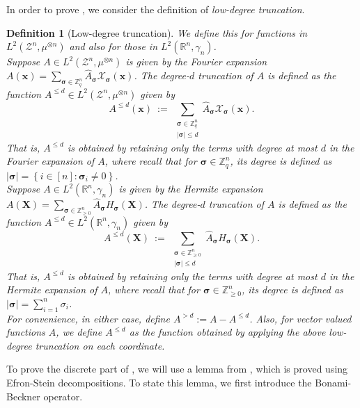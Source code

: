 \documentclass[11pt]{article}
\newcommand{\inbrace}[1]{\left \{ #1 \right \}}
\newcommand{\set}[1]{\inbrace{#1}}
\newcommand{\setdef}[2]{\set{#1 : #2}}
\newcommand{\what}[1]{\widehat{#1}}
\newcommand{\bbR}{{\mathbb R}}
\newcommand{\bbZ}{{\mathbb Z}}
\newcommand{\bx}{{\bm x}}
\newcommand{\bX}{\mathbf{X}}
\newcommand{\bsigma}{{\boldsymbol \sigma}}
\newcommand{\calX}{\mathcal{X}}
\newcommand{\calZ}{\mathcal{Z}}
\newtheorem{defn}[theorem]{Definition}
\begin{document}
\noindent In order to prove , we consider the definition of {\em low-degree truncation}.

\begin{defn}[Low-degree truncation]\label{def:low_deg_truncation}
	We define this for functions in $L^2(\calZ^n, \mu^{\otimes n})$ and also for those in $L^2(\bbR^n, \gamma_n)$.\\
	
	 Suppose $A \in L^2(\calZ^n, \mu^{\otimes n})$ is given by the Fourier expansion $A(\bx) = \sum\limits_{\bsigma \in \bbZ_q^n} \what{A}_{\bsigma} \calX_{\bsigma}(\bx)$. The {\em degree-$d$ truncation} of $A$ is defined as the function $A^{\le d} \in L^2(\calZ^n, \mu^{\otimes n})$ given by
	\[A^{\le d}(\bx) ~:=~ \sum_{\substack{\bsigma \in \bbZ_q^n \\ |\bsigma| \le d}} \what{A}_{\bsigma} \calX_{\bsigma}(\bx).\]
	That is, $A^{\le d}$ is obtained by retaining only the terms with degree at most $d$ in the Fourier expansion of $A$, where recall that for $\bsigma \in \bbZ_q^n$, its degree is defined as $|\bsigma| = \setdef{i \in [n]}{\bsigma_i \ne 0}$.\\
	
	 Suppose $A \in L^2(\bbR^n, \gamma_n)$ is given by the Hermite expansion $A(\bX) = \sum_{\bsigma \in \bbZ_{\ge 0}^n} \what{A}_\bsigma H_{\bsigma}(\bX)$. The {\em degree-$d$ truncation} of $A$ is defined as the function $A^{\le d} \in L^2(\bbR^n, \gamma_n)$ given by
	\[A^{\le d}(\bX) ~:=~ \sum_{\substack{\bsigma \in \bbZ_{\ge 0}^n \\ |\bsigma| \le d}} \what{A}_{\bsigma} H_{\bsigma}(\bX).\]
	That is, $A^{\le d}$ is obtained by retaining only the terms with degree at most $d$ in the Hermite expansion of $A$, where recall that for $\bsigma \in \bbZ_{\ge 0}^n$, its degree is defined as $|\bsigma| = \sum_{i=1}^{n} \sigma_i$.\\
	
	\noindent For convenience, in either case, define $A^{> d} := A - A^{\le d}$. Also, for vector valued functions $A$, we define $A^{\le d}$ as the function obtained by applying the above low-degree truncation on each coordinate.
\end{defn}
To prove the discrete part of , we will use a lemma from \cite[Lemma 6.1]{mossel2010gaussianbounds}, which is proved using Efron-Stein decompositions. To state this lemma, we first introduce the Bonami-Beckner operator.
\end{document}
